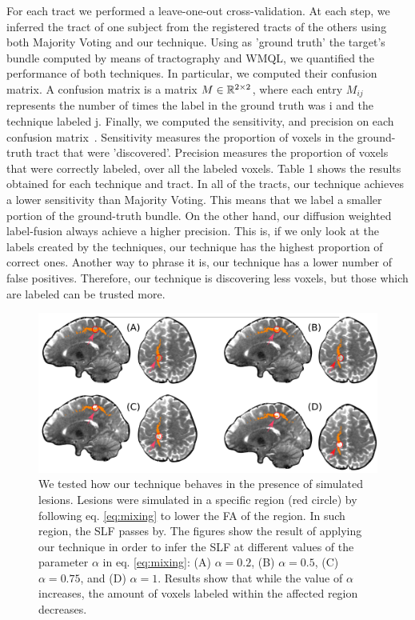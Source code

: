 For each tract we performed a leave-one-out cross-validation. At each step, we
inferred the tract of one subject from the registered tracts of the others
using both Majority Voting and our technique. Using as 'ground truth' the
target's bundle computed by means of tractography and WMQL, we quantified the
performance of both techniques. In particular, we computed their confusion matrix.
A confusion matrix is a matrix $M \in \mathbb{R}^{2\times2}$, where each entry $M_{ij}$
represents the number of times the label in the ground truth was i and the
technique labeled j. Finally, we computed the sensitivity, and precision on
each confusion matrix~\cite{Kuhn2013}. Sensitivity measures the proportion of voxels
in the ground-truth tract that were 'discovered'. Precision measures the proportion
of voxels that were correctly labeled, over all the labeled voxels. Table 1 shows
the results obtained for each technique and tract. In all of the tracts, our
technique achieves a lower sensitivity than Majority Voting. This means that
we label a smaller portion of the ground-truth bundle. On the other hand,
our diffusion weighted label-fusion always achieve a higher precision. This
is, if we only look at the labels created by the techniques, our technique
has the highest proportion of correct ones. Another way to phrase it is, our
technique has a lower number of false positives.
Therefore, our technique is discovering less voxels, but those which are labeled
can be trusted more.

\begin{figure}[t]
    \includegraphics[width=\textwidth]{7.multiatlas/img/pathology.png}
    \caption{We tested how our technique behaves in the presence of simulated lesions.
             Lesions were simulated in a specific region (red circle) by following
             eq. \ref{eq:mixing} to lower the FA of the region. In such region,
             the SLF passes by. The figures show the result of applying our technique 
             in order to infer the SLF at different values of the parameter $\alpha$ in
             eq. \ref{eq:mixing}: (A) $\alpha=0.2$, (B) $\alpha=0.5$, (C) $\alpha=0.75$, and (D) $\alpha=1$.
             Results show that while the value of $\alpha$ increases, the amount of voxels
             labeled within the affected region decreases.}
    \label{fig:labeling}
\end{figure}


